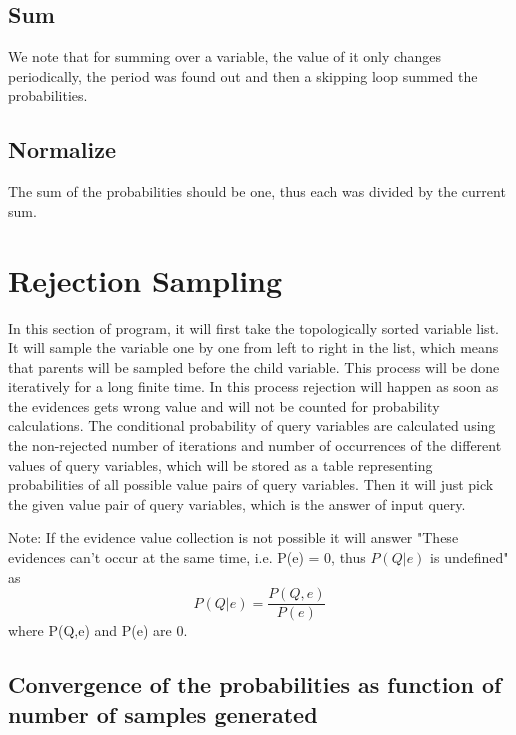 \documentclass[12pt]{article}
\begin{document}
\subsection{Sum}
We note that for summing over a variable, the value of it only changes periodically, the period was found out and then a skipping loop summed the probabilities.

\subsection{Normalize}
The sum of the probabilities should be one, thus each was divided by the current sum.

\section{Rejection Sampling}
In this section of program, it will first take the topologically sorted variable list. It will sample the variable one by one from left to right in the list, which means that parents will be sampled before the child variable.
This process will be done iteratively for a long finite time. In this process rejection will happen as soon as the evidences gets wrong value and will not be counted for probability calculations.
The conditional probability of query variables are calculated using the non-rejected number of iterations and number of occurrences of the different values of query variables, which will be stored as a table representing probabilities of all possible value pairs of query variables.
Then it will just pick the given value pair of query variables, which is the answer of input query.

Note: If the evidence value collection is not possible it will answer "These evidences can't occur at the same time, i.e. P(e) = 0, thus \(P(Q|e)\) is undefined"
as
\[P(Q|e)=\frac{P(Q,e)}{P(e)}\]
where P(Q,e) and P(e) are 0.

\subsection{Convergence of the probabilities as function of\\ number of samples generated}
\end{document}
